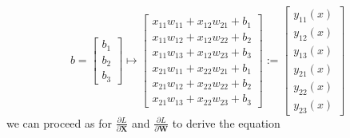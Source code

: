 \documentclass{article}
\begin{document}
\[
    b = \begin{bmatrix}
        b_{1} \\
        b_{2} \\
        b_{3}
    \end{bmatrix} \mapsto \begin{bmatrix}
        x_{11}w_{11} + x_{12}w_{21} + b_{1} \\
        x_{11}w_{12} + x_{12}w_{22} + b_{2} \\
        x_{11}w_{13} + x_{12}w_{23} + b_{3} \\
        x_{21}w_{11} + x_{22}w_{21} + b_{1} \\
        x_{21}w_{12} + x_{22}w_{22} + b_{2} \\
        x_{21}w_{13} + x_{22}w_{23} + b_{3}
    \end{bmatrix} := \begin{bmatrix}
        y_{11}(x) \\
        y_{12}(x) \\
        y_{13}(x) \\
        y_{21}(x) \\
        y_{22}(x) \\
        y_{23}(x)
    \end{bmatrix}
\]
we can proceed as for \(\frac{\partial L}{\partial \mathbf{X}}\) and 
\(\frac{\partial L}{\partial \mathbf{W}}\) to derive the equation
\setlength{\arraycolsep}{1.3pt}
\end{document}
